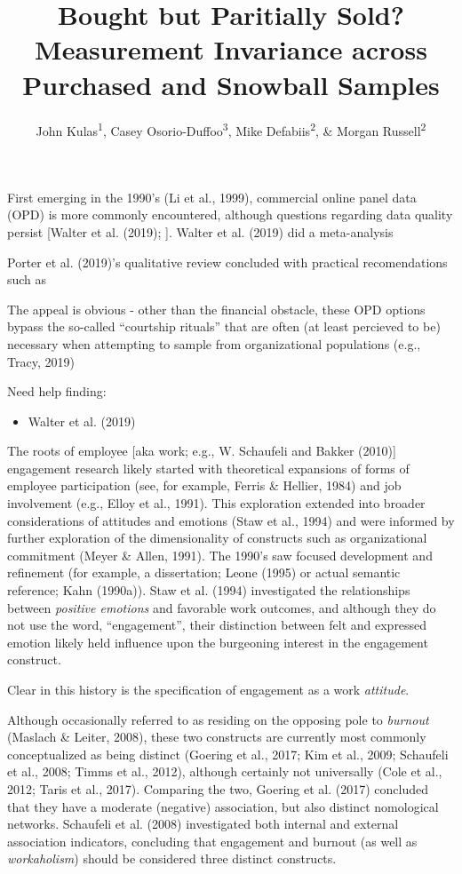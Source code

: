 \documentclass[
  man]{apa7}
\title{Bought but Paritially Sold? Measurement Invariance across Purchased and Snowball Samples}
\author{John Kulas\textsuperscript{1}, Casey Osorio-Duffoo\textsuperscript{3}, Mike Defabiis\textsuperscript{2}, \& Morgan Russell\textsuperscript{2}}
\date{}
\affiliation{\vspace{0.5cm}\textsuperscript{1} eRg\\\textsuperscript{2} Harver\\\textsuperscript{3} Montclair State University}
\providecommand{\tightlist}{%
  \setlength{\itemsep}{0pt}\setlength{\parskip}{0pt}}
\begin{document}
\maketitle

First emerging in the 1990's (Li et al., 1999), commercial online panel data (OPD) is more commonly encountered, although questions regarding data quality persist {[}Walter et al. (2019); {]}. Walter et al. (2019) did a meta-analysis

Porter et al. (2019)'s qualitative review concluded with practical recomendations such as

The appeal is obvious - other than the financial obstacle, these OPD options bypass the so-called ``courtship rituals'' that are often (at least percieved to be) necessary when attempting to sample from organizational populations (e.g., Tracy, 2019)

Need help finding:

\begin{itemize}
\tightlist
\item
  Walter et al. (2019)
\end{itemize}

The roots of employee {[}aka work; e.g., W. Schaufeli and Bakker (2010){]} engagement research likely started with theoretical expansions of forms of employee participation (see, for example, Ferris \& Hellier, 1984) and job involvement (e.g., Elloy et al., 1991). This exploration extended into broader considerations of attitudes and emotions (Staw et al., 1994) and were informed by further exploration of the dimensionality of constructs such as organizational commitment (Meyer \& Allen, 1991). The 1990's saw focused development and refinement (for example, a dissertation; Leone (1995) or actual semantic reference; Kahn (1990a)). Staw et al. (1994) investigated the relationships between \emph{positive emotions} and favorable work outcomes, and although they do not use the word, ``engagement'', their distinction between felt and expressed emotion likely held influence upon the burgeoning interest in the engagement construct.

Clear in this history is the specification of engagement as a work \emph{attitude}.

Although occasionally referred to as residing on the opposing pole to \emph{burnout} (Maslach \& Leiter, 2008), these two constructs are currently most commonly conceptualized as being distinct (Goering et al., 2017; Kim et al., 2009; Schaufeli et al., 2008; Timms et al., 2012), although certainly not universally (Cole et al., 2012; Taris et al., 2017). Comparing the two, Goering et al. (2017) concluded that they have a moderate (negative) association, but also distinct nomological networks. Schaufeli et al. (2008) investigated both internal and external association indicators, concluding that engagement and burnout (as well as \emph{workaholism}) should be considered three distinct constructs.
\end{document}
